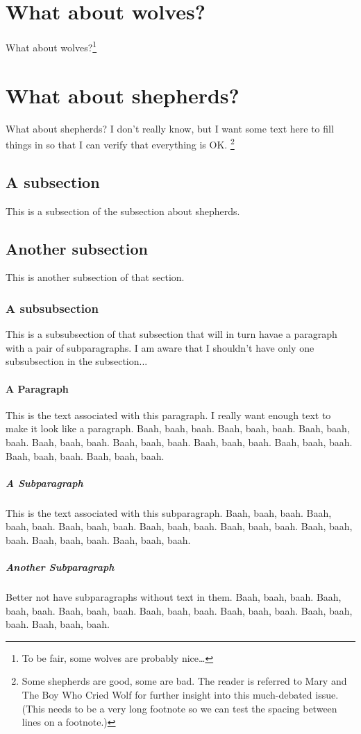 \documentclass[thesis,proposal]{umassthesis}  %
\begin{document}
\section{What about wolves?}
What about wolves?\footnote{To be fair, some wolves are probably nice\ldots}

\section{What about shepherds?}
What about shepherds?  I don't really know, but I want some text here
to fill things in so that I can verify that everything is OK.%
\footnote{Some shepherds are good, some are bad. The reader is referred
  to Mary and The Boy Who Cried Wolf for further insight into this
  much-debated issue. (This needs to be a very long footnote so we can
  test the spacing between lines on a footnote.)}
\subsection{A subsection}
This is a subsection of the subsection about shepherds.
\subsection{Another subsection}
This is another subsection of that section.
\subsubsection{A subsubsection}
This is a subsubsection of that subsection that will in turn havae a
paragraph with a pair of subparagraphs.  I am aware that I shouldn't
have only one subsubsection in the subsection...
\paragraph{A Paragraph} 
This is the text associated with this paragraph.  I really want enough
text to make it look like a paragraph.  Baah, baah, baah.  Baah, baah,
baah.  Baah, baah, baah.  Baah, baah, baah.  Baah, baah, baah.  Baah,
baah, baah.  Baah, baah, baah.  Baah, baah, baah.  Baah, baah, baah. 
\subparagraph{A Subparagraph} 
This is the text associated with this subparagraph.  Baah, baah, baah.
Baah, baah, baah.  Baah, baah, baah.  Baah, baah, baah.  Baah, baah,
baah.  Baah, baah, baah.  Baah, baah, baah.  Baah, baah, baah. 
\subparagraph{Another Subparagraph}
Better not have subparagraphs without text in them.  Baah, baah, baah.
Baah, baah, baah.  Baah, baah, baah.  Baah, baah, baah.  Baah, baah,
baah.  Baah, baah, baah.  Baah, baah, baah. 
\end{document}
